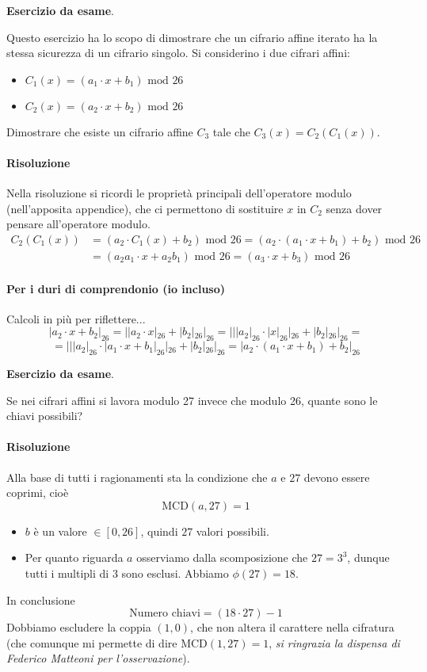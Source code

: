 \begin{framed}
	\noindent \textbf{Esercizio da esame}.
	
	\noindent Questo esercizio ha lo scopo di dimostrare che un cifrario affine iterato ha la stessa sicurezza di un
	cifrario singolo.
	Si considerino i due cifrari affini:
	\begin{itemize}
		\item $C_1(x) = (a_1 \cdot x + b_1) \text{ mod } 26$
		\item $C_2(x) = (a_2 \cdot x + b_2) \text{ mod } 26$
	\end{itemize}	
	Dimostrare che esiste un cifrario affine $C_3$ tale che $C_3(x) = C_2(C_1(x))$.
	
	\paragraph{Risoluzione} Nella risoluzione si ricordi le proprietà principali dell'operatore modulo (nell'apposita appendice), che ci permettono di sostituire $x$ in $C_2$ senza dover pensare all'operatore modulo.
	\begin{align*}C_2(C_1(x))&=(a_2 \cdot C_1(x) + b_2) \text{ mod } 26=(a_2 \cdot (a_1 \cdot x + b_1) + b_2) \text{ mod } 26\\&=(a_2a_1 \cdot x+ a_2b_1)\text{ mod }26=(a_3 \cdot x + b_3)\text{ mod } 26\end{align*}
	\paragraph{Per i duri di comprendonio (io incluso)} Calcoli in più per riflettere...
	$$|a_2 \cdot x + b_2|_{26}=||a_2 \cdot x|_{26} + |b_2|_{26}|_{26}=|||a_2|_{26} \cdot |x|_{26}|_{26} + |b_2|_{26}|_{26}=$$
	$$=|||a_2|_{26} \cdot |a_1\cdot x + b_1|_{26}|_{26} + |b_2|_{26}|_{26}=|a_2 \cdot (a_1\cdot x + b_1) + b_2|_{26}$$
\end{framed} 

\begin{framed}
	\noindent \textbf{Esercizio da esame}.
	
	\noindent Se nei cifrari affini si lavora modulo 27 invece che modulo 26, quante sono le chiavi possibili? 
	
	\paragraph{Risoluzione} Alla base di tutti i ragionamenti sta la condizione che $a$ e $27$ devono essere coprimi, cioè
	$$\text{MCD}(a,27)=1$$
	\begin{itemize}
		\item $b$ è un valore $\in [0,26]$, quindi $27$ valori possibili.
		\item Per quanto riguarda $a$ osserviamo dalla scomposizione che $27=3^3$, dunque tutti i multipli di $3$ sono esclusi. Abbiamo $\phi(27)=18$.
	\end{itemize}
	In conclusione
	$$\text{Numero chiavi} = (18 \cdot 27)-1$$
	Dobbiamo escludere la coppia $(1,0)$, che non altera il carattere nella cifratura (che comunque mi permette di dire $\text{MCD}(1,27)=1$, \emph{si ringrazia la dispensa di Federico Matteoni per l'osservazione}).
\end{framed} 

